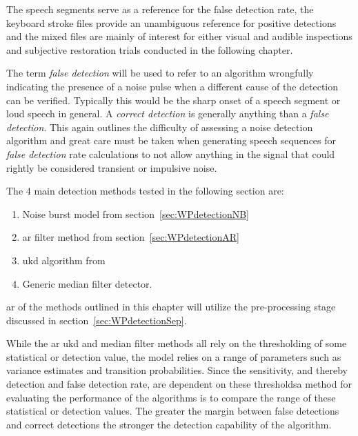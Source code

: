 The speech segments serve as a reference for the false detection rate, the keyboard stroke files provide an unambiguous reference for positive detections and the mixed files are mainly of interest for either visual and audible inspections and subjective restoration trials conducted in the following chapter. \DIFaddbegin {}\DIFaddend

The term \emph{false detection} will be used to refer to an algorithm wrongfully indicating the presence of a noise pulse when a different cause of the detection can be verified. Typically this would be the sharp onset of a speech segment or \DIFdelbegin {}\DIFdelend loud speech in general. A \emph{correct detection} is generally anything \DIFdelbegin {}\DIFdelend \DIFaddbegin {}\DIFaddend than a \emph{false detection}. This again outlines the difficulty of assessing a noise detection algorithm and great care must be taken when generating speech sequences for \emph{false detection} rate calculations to not allow anything in the signal that could rightly be considered transient or impulsive noise.

The 4 main detection methods tested in the following section are:
\begin{enumerate}
  \item Noise burst model from section~\ref{sec:WPdetectionNB}
  \item \DIFdelbegin {}\DIFdelend \DIFaddbegin \gls{ar} \DIFaddend filter method from section~\ref{sec:WPdetectionAR}
  \item \DIFdelbegin {}\DIFdelend \DIFaddbegin \gls{ukd} \DIFaddend algorithm from \cite{Subramanya2007}
  \item Generic median filter detector.
\end{enumerate}
\DIFdelbegin {}\DIFdelend \DIFaddbegin {}\gls{ar} \DIFaddend of the methods outlined in this chapter will utilize the pre-processing stage discussed in section~\ref{sec:WPdetectionSep}.

While the \DIFdelbegin {}\DIFdelend \DIFaddbegin \gls{ar} \gls{ukd} \DIFaddend and median filter methods all rely on the thresholding of some statistical or detection value, the \DIFdelbegin {}\DIFdelend \DIFaddbegin {}\DIFaddend model relies on a range of parameters such as variance estimates and transition probabilities. Since the sensitivity, and thereby detection and false detection rate, are dependent on these thresholds\DIFaddbegin \DIFadd{, }\DIFaddend a method for evaluating the performance of the algorithms is to compare the range of these statistical or detection values. The greater the margin between false detections and correct detections the stronger the detection capability of the algorithm.

